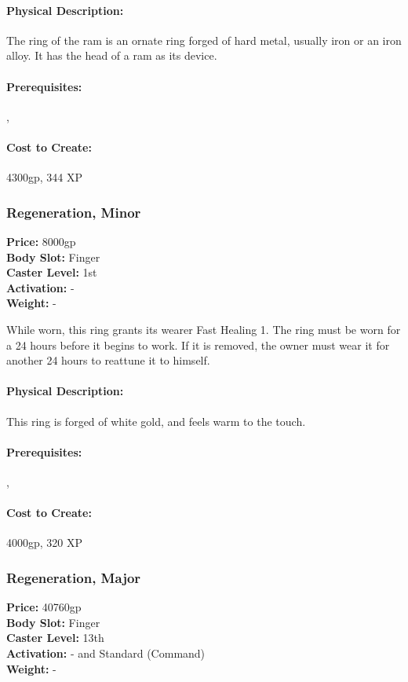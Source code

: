 \paragraph{Physical Description:} The ring of the ram is an ornate ring forged of hard metal, usually iron or an iron alloy. It has the head of a ram as its device.

\paragraph{Prerequisites:} , 

\paragraph{Cost to Create:} 4300gp, 344 XP
\subsubsection{Regeneration, Minor}
\label{Item:RegenerationMinor}
   \textbf{Price:} 8000gp
\\ \textbf{Body Slot:} Finger
\\ \textbf{Caster Level:} 1st
\\ \textbf{Activation:} -
\\ \textbf{Weight:} -

While worn, this ring grants its wearer Fast Healing 1.
The ring must be worn for a 24 hours before it begins to work. If it is removed, the owner must wear it for another 24 hours to reattune it to himself.

\paragraph{Physical Description:} This ring is forged of white gold, and feels warm to the touch.

\paragraph{Prerequisites:} , 

\paragraph{Cost to Create:} 4000gp, 320 XP

\subsubsection{Regeneration, Major}
\label{Item:RegenerationMajor}
   \textbf{Price:} 40760gp
\\ \textbf{Body Slot:} Finger
\\ \textbf{Caster Level:} 13th
\\ \textbf{Activation:} - and Standard (Command)
\\ \textbf{Weight:} -

